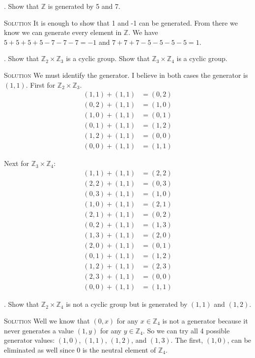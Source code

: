 \documentclass[twoside]{amsart}
\newcommand{\solution}{\textsc{Solution}\xspace}
\begin{document}
\begin{enumerate}[A.]
    . Show that $\mathbb{Z}$ is generated by 5 and 7.

    \noindent \solution It is enough to show that 1 and -1 can be generated.
    From there we know we can generate every element in $\mathbb{Z}$.
    We have $5+5+5+5-7-7-7=-1$ and $7+7+7-5-5-5-5=1$.

    . Show that $\mathbb{Z}_2 \times \mathbb{Z}_3$ is a cyclic
    group. Show that $\mathbb{Z}_3 \times \mathbb{Z}_4$ is a cyclic group.

    \noindent \solution We must identify the generator. I believe in both
    cases the generator is $(1,1)$. First for $\mathbb{Z}_2 \times
    \mathbb{Z}_3$.
    \begin{align*}
        (1,1) + (1,1) &= (0,2) \\
	(0,2) + (1,1) &= (1,0) \\
	(1,0) + (1,1) &= (0,1) \\
	(0,1) + (1,1) &= (1,2) \\
	(1,2) + (1,1) &= (0,0) \\
	(0,0) + (1,1) &= (1,1)
    \end{align*}

    Next for $\mathbb{Z}_3 \times \mathbb{Z}_4$:
    \begin{align*}
        (1,1) + (1,1) &= (2,2) \\
	(2,2) + (1,1) &= (0,3) \\
	(0,3) + (1,1) &= (1,0) \\
	(1,0) + (1,1) &= (2,1) \\
	(2,1) + (1,1) &= (0,2) \\
	(0,2) + (1,1) &= (1,3) \\
	(1,3) + (1,1) &= (2,0) \\
	(2,0) + (1,1) &= (0,1) \\
	(0,1) + (1,1) &= (1,2) \\
	(1,2) + (1,1) &= (2,3) \\
	(2,3) + (1,1) &= (0,0) \\
	(0,0) + (1,1) &= (1,1)
    \end{align*}

    . Show that $\mathbb{Z}_2 \times \mathbb{Z}_4$ is not a cyclic
    group but is generated by $(1,1)$ and $(1,2)$. 
    
    \noindent \solution Well we know that
    $(0,x)$ for any $x \in \mathbb{Z}_4$ is not a generator because it
    never generates a value $(1,y)$ for any $y \in \mathbb{Z}_4$. So we
    can try all 4 possible generator values: $(1,0)$, $(1,1)$, $(1,2)$,
    and $(1,3)$. The first, $(1,0)$, can be eliminated as well since
    0 is the neutral element of $\mathbb{Z}_4$. 


\end{enumerate}
\end{document}
